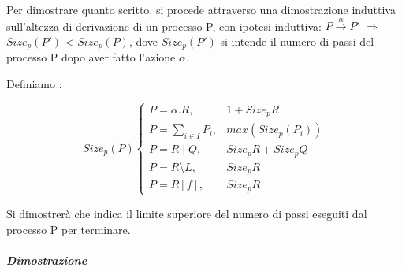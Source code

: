 Per dimostrare quanto scritto, si procede attraverso una dimostrazione induttiva sull'altezza di derivazione di un processo P, con ipotesi induttiva: \(P \overset{\alpha}\rightarrow P'\) $\Rightarrow$ $Size_{p}(P')$ < $Size_{p}(P)$, dove $Size_{p}(P')$ si intende il numero di passi del processo P dopo aver fatto l'azione $\alpha$.

Definiamo :

\[
Size_{p}(P)
\begin{cases}
P=\alpha.R,     & 1+Size_{p}{R}                \\
P=\displaystyle\sum_{i\in I}^{}P_{i},          & max(Size_{p}(P_{i})) \\
P=R\mid Q,      & Size_{p}{R}+Size_{p}{Q}       \\
P=R\setminus L, & Size_{p}{R}                  \\
P=R[f],         & Size_{p}{R}
\end{cases}
\]

Si dimostrerà che  indica il limite superiore del numero di passi eseguiti dal processo P per terminare.

\subparagraph{Dimostrazione} \mbox{}

